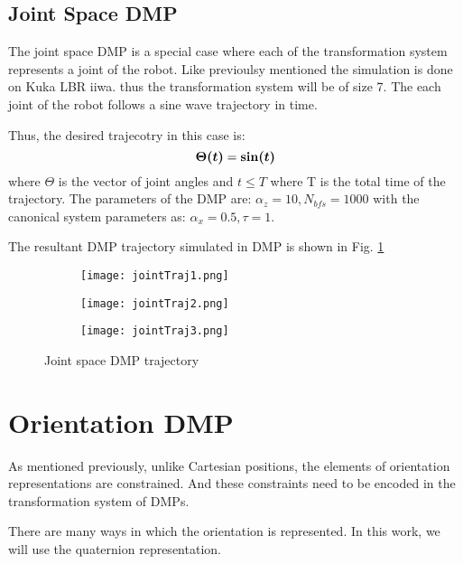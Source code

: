 \subsection{Joint Space DMP}
The joint space DMP is a special case where each of the transformation system represents a joint of the robot.
Like previoulsy mentioned the simulation is done on Kuka LBR iiwa. thus the transformation system will be of size 7.
The each joint of the robot follows a sine wave trajectory in time. 

Thus, the desired trajecotry in this case is:
\begin{equation}
    \boldsymbol{\Theta(t)} = \boldsymbol{\sin(t)} 
\end{equation}
where $\Theta$ is the vector of joint angles and $t \leq T$ where T is the total time of the trajectory.
The parameters of the DMP are: $\alpha_z = 10, N_{bfs} = 1000$ with the canonical system parameters as: 
$\alpha_x = 0.5, \tau = 1$.

The resultant DMP trajectory simulated in DMP is shown in Fig. \ref{fig:joint_traj_pybullet}

\begin{figure}[h]
    \centering
    \begin{subfigure}{0.3\textwidth}
        \texttt{[image: jointTraj1.png]}
    \end{subfigure}%
    \begin{subfigure}{0.3\textwidth}
        \texttt{[image: jointTraj2.png]}
    \end{subfigure}%
    \begin{subfigure}{0.3\textwidth}
        \texttt{[image: jointTraj3.png]}
    \end{subfigure}%
    \caption{Joint space DMP trajectory}
    \label{fig:joint_traj_pybullet}

\end{figure}

\section{Orientation DMP}
As mentioned previously, unlike Cartesian positions, the elements of orientation representations are constrained.
And these constraints need to be encoded in the transformation system of DMPs.

There are many ways in which the orientation is represented. In this work, we will use the quaternion representation.

